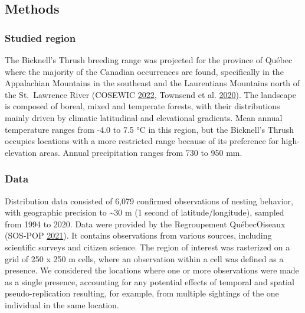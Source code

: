 \documentclass[12pt]{article}
\begin{document}
\hypertarget{methods}{%
\subsection{Methods}\label{methods}}

\hypertarget{studied-region}{%
\subsubsection{Studied region}\label{studied-region}}

The Bicknell's Thrush breeding range was projected for the province of
Québec where the majority of the Canadian occurrences are found,
specifically in the Appalachian Mountains in the southeast and the
Laurentians Mountains north of the St.~Lawrence River (COSEWIC
\protect\hyperlink{ref-cosewic_cosewic_2022}{2022}, Townsend et al.
\protect\hyperlink{ref-billerman_bicknells_2020}{2020}). The landscape
is composed of boreal, mixed and temperate forests, with their
distributions mainly driven by climatic latitudinal and elevational
gradients. Mean annual temperature ranges from -4.0 to 7.5 °C in this
region, but the Bicknell's Thrush occupies locations with a more
restricted range because of its preference for high-elevation areas.
Annual precipitation ranges from 730 to 950 mm.

\hypertarget{data}{%
\subsubsection{Data}\label{data}}

Distribution data consisted of 6,079 confirmed observations of nesting
behavior, with geographic precision to \textasciitilde30 m (1 second of
latitude/longitude), sampled from 1994 to 2020. Data were provided by
the Regroupement QuébecOiseaux (SOS-POP
\protect\hyperlink{ref-sos-pop_banque_2021}{2021}). It contains
observations from various sources, including scientific surveys and
citizen science. The region of interest was rasterized on a grid of 250
x 250 m cells, where an observation within a cell was defined as a
presence. We considered the locations where one or more observations
were made as a single presence, accounting for any potential effects of
temporal and spatial pseudo-replication resulting, for example, from
multiple sightings of the one individual in the same location.
\end{document}
